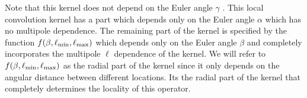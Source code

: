 Note that this kernel does not depend on the Euler angle $\gamma$ . This local convolution kernel has a part which depends only on the Euler angle $\alpha$ which has no multipole dependence. The remaining part of the kernel is specified by the function $f(\beta,\ell_{\rm min},\ell_{\rm max})$ which depends only on the Euler angle $\beta$ and completely incorporates the multipole $\ell$ dependence of the kernel. We will refer to $f(\beta,\ell_{\rm min},\ell_{\rm max})$ as the radial part of the kernel since it only depends on the angular distance between different locations. Its the radial part of the kernel that completely determines the locality of this operator. 

 
